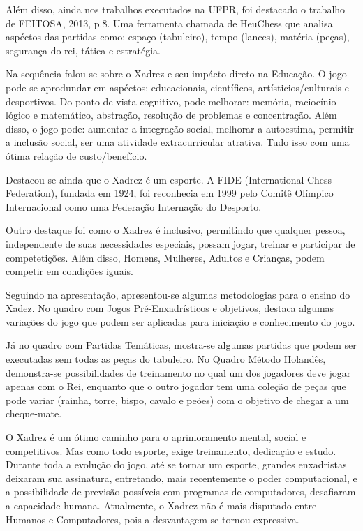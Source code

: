 \documentclass[12pt]{article}
\begin{document}
Além disso, ainda nos trabalhos executados na UFPR, foi destacado o trabalho de FEITOSA, 2013, p.8. Uma ferramenta chamada de HeuChess que analisa aspéctos das partidas como: espaço (tabuleiro), tempo (lances), matéria (peças), segurança do rei, tática e estratégia.

Na sequência falou-se sobre o Xadrez e seu impácto direto na Educação. O jogo pode se aprodundar em aspéctos: educacionais, científicos, artísticios/culturais e desportivos. Do ponto de vista cognitivo, pode melhorar: memória, raciocínio lógico e matemático, abstração, resolução de problemas e concentração. Além disso, o jogo pode: aumentar a integração social, melhorar a autoestima, permitir a inclusão social, ser uma atividade extracurricular atrativa. Tudo isso com uma ótima relação de custo/benefício.

Destacou-se ainda que o Xadrez é um esporte. A FIDE (International Chess Federation), fundada em 1924, foi reconhecia em 1999 pelo Comitê Olímpico Internacional como uma Federação Internação do Desporto.

Outro destaque foi como o Xadrez é inclusivo, permitindo que qualquer pessoa, independente de suas necessidades especiais, possam jogar, treinar e participar de competetições. Além disso, Homens, Mulheres, Adultos e Crianças, podem competir em condições iguais.

Seguindo na apresentação, apresentou-se algumas metodologias para o ensino do Xadez. No quadro com Jogos Pré-Enxadrísticos e objetivos, destaca algumas variações do jogo que podem ser aplicadas para iniciação e conhecimento do jogo.

Já no quadro com Partidas Temáticas, mostra-se algumas partidas que podem ser executadas sem todas as peças do tabuleiro. No Quadro Método Holandês, demonstra-se possibilidades de treinamento no qual um dos jogadores deve jogar apenas com o Rei, enquanto que o outro jogador tem uma coleção de peças que pode variar (rainha, torre, bispo, cavalo e peões) com o objetivo de chegar a um cheque-mate.

O Xadrez é um ótimo caminho para o aprimoramento mental, social e competitivos. Mas como todo esporte, exige treinamento, dedicação e estudo. Durante toda a evolução do jogo, até se tornar um esporte, grandes enxadristas deixaram sua assinatura, entretando, mais recentemente o poder computacional, e a possibilidade de previsão possíveis com programas de computadores, desafiaram a capacidade humana. Atualmente, o Xadrez não é mais disputado entre Humanos e Computadores, pois a desvantagem se tornou expressiva.
\end{document}
